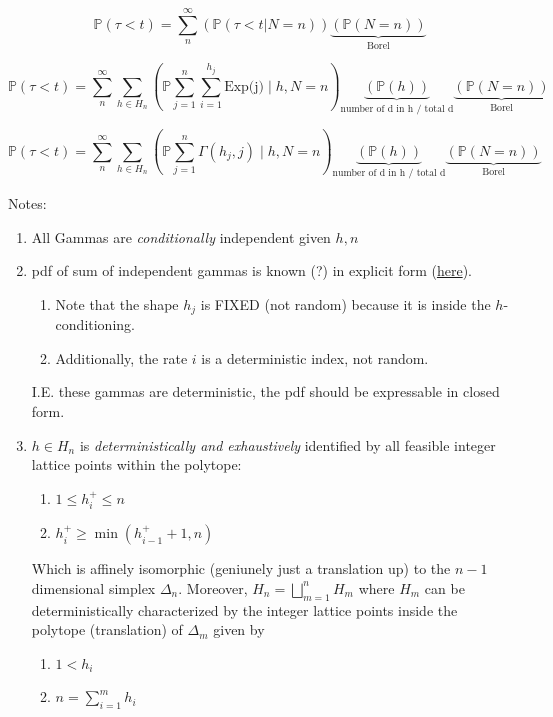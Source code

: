 \documentclass[opre,nonblindrev]{informs4}
\begin{document}
\[ \mathbb{P} ({\tau < t}) = \sum_n^\infty (\mathbb{P}( \tau < t | N=n)) \underbrace{(\mathbb{P}(N=n))}_{\text{Borel}} \]

\[ \mathbb{P} ({\tau < t}) = \sum_n^\infty \sum_{h \in H_n} (\mathbb{P} \sum_{j=1}^n \sum_{i=1}^{h_j} \text{Exp(j)} \mid h, N=n)\underbrace{(\mathbb{P}(h))}_{\text{number of d in h / total d}}\underbrace{(\mathbb{P}(N=n))}_{\text{Borel}} \]

\[ \mathbb{P} ({\tau < t}) = \sum_n^\infty \sum_{h \in H_n} (\mathbb{P} \sum_{j=1}^n \Gamma(h_j, j) \mid h, N=n)\underbrace{(\mathbb{P}(h))}_{\text{number of d in h / total d}}\underbrace{(\mathbb{P}(N=n))}_{\text{Borel}} \]

Notes:

\begin{enumerate}
    \item All Gammas are \textit{conditionally} independent given $h,n$
    \item pdf of sum of independent gammas is known (?) in explicit form (\hyperlink{https://www-personal.umd.umich.edu/~fmassey/gammaRV/}{here}). 
    \begin{enumerate}
        \item Note that the shape $h_j$ is FIXED (not random) because it is inside the $h$-conditioning. 
        \item Additionally, the rate $i$ is a deterministic index, not random.
    \end{enumerate}
    I.E. these gammas are deterministic, the pdf should be expressable in closed form.
    \item $h \in H_n$ is \textit{deterministically and exhaustively} identified by all feasible integer lattice points within the polytope:
    \begin{enumerate}
        \item $1 \le h_i^+ \le n$
        \item $ h_i^+ \ge \min(h_{i-1}^+ +1, n)$
    \end{enumerate}
    Which is affinely isomorphic (geniunely just a translation up) to the $n-1$ dimensional simplex $\Delta_n$. Moreover, $H_n = \bigsqcup_{m=1}^n H_m$ where $H_m$ can be deterministically characterized by the integer lattice points inside the polytope (translation) of $\Delta_m$ given by 
    \begin{enumerate}
        \item $1 < h_i$
        \item $ n = \sum_{i=1}^m h_i $ 
    \end{enumerate}
\end{enumerate}
\end{document}
